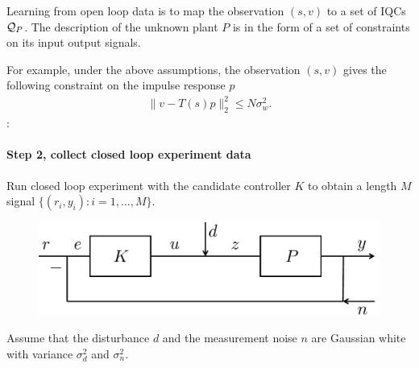 \documentclass[11pt, onecolumn]{article}
\newcommand{\rb}[1]{{\color{red}{Ross: #1}}}
\begin{document}
\begin{definition}
  Learning from open loop data is to map the observation $(s,v)$ to a set of IQCs $\mathcal Q_P$.  The
  description of the unknown plant $P$ is in the form of a set of constraints on its input output
  signals.


  For example, under the above assumptions, the observation $(s,v)$ gives the following constraint
  on the impulse response $p$
  \begin{align*}
    \|v - T(s) p \|_2^2 \le N \sigma_w^2.
  \end{align*}
  \rb{Doesn't this only hold in expectation/WHP? The constraint is fine, but it
    doesn't ``follow from the assumption''.}:


\end{definition}

\paragraph{Step 2,  collect closed  loop experiment data}
Run closed loop experiment with the candidate controller $K$ to obtain a length $M$ signal
$\{(r_i,y_i) : i=1,\dots, M\}$.
\begin{figure}[!ht]
  \centering
  \includegraphics[width=.5\linewidth]{sys2.pdf}
\end{figure}

\begin{assumption}
  Assume that the disturbance $d$ and the measurement noise $n$ are Gaussian white with variance
  $\sigma_d^2$ and $\sigma_n^2$.
\end{assumption}
\end{document}
